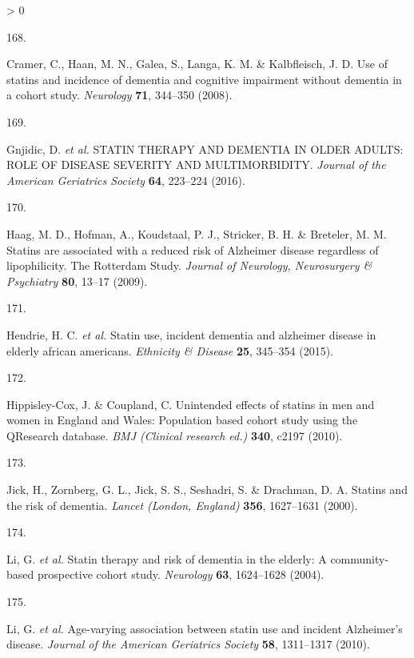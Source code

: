 \documentclass[a4paper, twoside]{templates/ociamthesis}
\newlength{\cslhangindent}
\newlength{\csllabelwidth}
\newenvironment{CSLReferences}[3] %
 {%
  \setlength{\parindent}{0pt}
  \ifodd #1 \everypar{\setlength{\hangindent}{\cslhangindent}}\ignorespaces\fi
  \ifnum #2 > 0
  \setlength{\parskip}{#2\baselineskip}
  \fi
 }%
 {}
\newcommand{\CSLLeftMargin}[1]{\parbox[t]{\maxof{\widthof{#1}}{\csllabelwidth}}{#1}}
\newcommand{\CSLRightInline}[1]{\parbox[t]{\linewidth - \csllabelwidth}{#1}}
\begin{document}
\begin{CSLReferences}{0}{0}
\leavevmode\hypertarget{ref-cramer2008}{}%
\CSLLeftMargin{168. }
\CSLRightInline{Cramer, C., Haan, M. N., Galea, S., Langa, K. M. \& Kalbfleisch, J. D. Use of statins and incidence of dementia and cognitive impairment without dementia in a cohort study. \emph{Neurology} \textbf{71}, 344--350 (2008).}

\leavevmode\hypertarget{ref-gnjidic2016}{}%
\CSLLeftMargin{169. }
\CSLRightInline{Gnjidic, D. \emph{et al.} {STATIN THERAPY AND DEMENTIA IN OLDER ADULTS}: {ROLE OF DISEASE SEVERITY AND MULTIMORBIDITY}. \emph{Journal of the American Geriatrics Society} \textbf{64}, 223--224 (2016).}

\leavevmode\hypertarget{ref-haag2009}{}%
\CSLLeftMargin{170. }
\CSLRightInline{Haag, M. D., Hofman, A., Koudstaal, P. J., Stricker, B. H. \& Breteler, M. M. Statins are associated with a reduced risk of {Alzheimer} disease regardless of lipophilicity. {The Rotterdam Study}. \emph{Journal of Neurology, Neurosurgery \& Psychiatry} \textbf{80}, 13--17 (2009).}

\leavevmode\hypertarget{ref-hendrie2015}{}%
\CSLLeftMargin{171. }
\CSLRightInline{Hendrie, H. C. \emph{et al.} Statin use, incident dementia and alzheimer disease in elderly african americans. \emph{Ethnicity \& Disease} \textbf{25}, 345--354 (2015).}

\leavevmode\hypertarget{ref-hippisley-cox2010a}{}%
\CSLLeftMargin{172. }
\CSLRightInline{Hippisley-Cox, J. \& Coupland, C. Unintended effects of statins in men and women in {England} and {Wales}: Population based cohort study using the {QResearch} database. \emph{BMJ (Clinical research ed.)} \textbf{340}, c2197 (2010).}

\leavevmode\hypertarget{ref-jick2000}{}%
\CSLLeftMargin{173. }
\CSLRightInline{Jick, H., Zornberg, G. L., Jick, S. S., Seshadri, S. \& Drachman, D. A. Statins and the risk of dementia. \emph{Lancet (London, England)} \textbf{356}, 1627--1631 (2000).}

\leavevmode\hypertarget{ref-li2004}{}%
\CSLLeftMargin{174. }
\CSLRightInline{Li, G. \emph{et al.} Statin therapy and risk of dementia in the elderly: A community-based prospective cohort study. \emph{Neurology} \textbf{63}, 1624--1628 (2004).}

\leavevmode\hypertarget{ref-li2010}{}%
\CSLLeftMargin{175. }
\CSLRightInline{Li, G. \emph{et al.} Age-varying association between statin use and incident {Alzheimer}'s disease. \emph{Journal of the American Geriatrics Society} \textbf{58}, 1311--1317 (2010).}


\end{CSLReferences}
\end{document}
